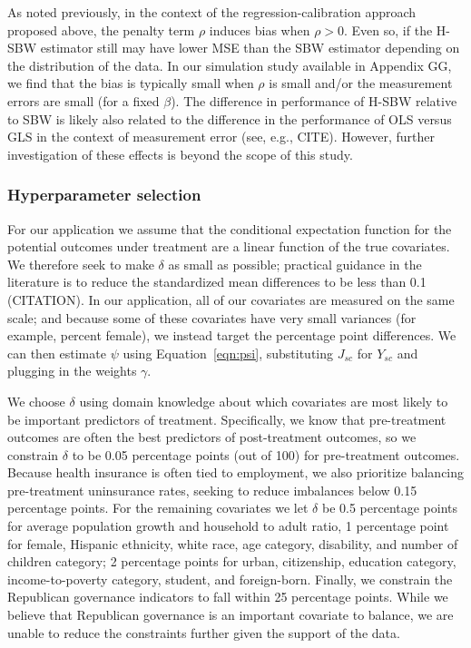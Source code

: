 \documentclass[aoas]{imsart}
\theoremstyle{plain}
\theoremstyle{remark}
\begin{document}
As noted previously, in the context of the regression-calibration approach proposed above, the penalty term $\rho$ induces bias when $\rho > 0$. Even so, if the H-SBW estimator still may have lower MSE than the SBW estimator depending on the distribution of the data. In our simulation study available in Appendix GG, we find that the bias is typically small when $\rho$ is small and/or the measurement errors are small (for a fixed $\beta$). The difference in performance of H-SBW relative to SBW is likely also related to the difference in the performance of OLS versus GLS in the context of measurement error (see, e.g., CITE). However, further investigation of these effects is beyond the scope of this study.

\subsubsection{Hyperparameter selection}

For our application we assume that the conditional expectation function for the potential outcomes under treatment are a linear function of the true covariates. We therefore seek to make $\delta$ as small as possible; practical guidance in the literature is to reduce the standardized mean differences to be less than 0.1 (CITATION). In our application, all of our covariates are measured on the same scale; and because some of these covariates have very small variances (for example, percent female), we instead target the percentage point differences. We can then estimate $\psi$ using Equation~\ref{eqn:psi}, substituting $J_{sc}$ for $Y_{sc}$ and plugging in the weights $\gamma$. 

We choose $\delta$ using domain knowledge about which covariates are most likely to be important predictors of treatment. Specifically, we know that pre-treatment outcomes are often the best predictors of post-treatment outcomes, so we constrain $\delta$ to be 0.05 percentage points (out of 100) for pre-treatment outcomes. Because health insurance is often tied to employment, we also prioritize balancing pre-treatment uninsurance rates, seeking to reduce imbalances below 0.15 percentage points. For the remaining covariates we let $\delta$ be 0.5 percentage points for average population growth and household to adult ratio, 1 percentage point for female, Hispanic ethnicity, white race, age category, disability, and number of children category; 2 percentage points for urban, citizenship, education category, income-to-poverty category, student, and foreign-born. Finally, we constrain the Republican governance indicators to fall within 25 percentage points. While we believe that Republican governance is an important covariate to balance, we are unable to reduce the constraints further given the support of the data.
\end{document}
